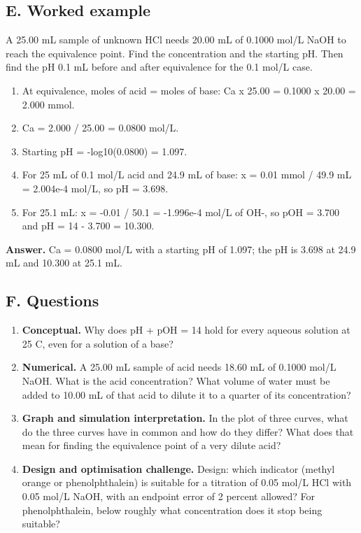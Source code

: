 \documentclass[11pt,a4paper]{article}
\begin{document}
\subsection*{E. Worked example}
A 25.00 mL sample of unknown HCl needs 20.00 mL of 0.1000 mol/L NaOH to reach the equivalence point. Find the concentration and the starting pH. Then find the pH 0.1 mL before and after equivalence for the 0.1 mol/L case.
\begin{enumerate}[nosep]
\item At equivalence, moles of acid = moles of base: Ca x 25.00 = 0.1000 x 20.00 = 2.000 mmol.
\item Ca = 2.000 / 25.00 = 0.0800 mol/L.
\item Starting pH = -log10(0.0800) = 1.097.
\item For 25 mL of 0.1 mol/L acid and 24.9 mL of base: x = 0.01 mmol / 49.9 mL = 2.004e-4 mol/L, so pH = 3.698.
\item For 25.1 mL: x = -0.01 / 50.1 = -1.996e-4 mol/L of OH-, so pOH = 3.700 and pH = 14 - 3.700 = 10.300.
\end{enumerate}
\textbf{Answer.} Ca = 0.0800 mol/L with a starting pH of 1.097; the pH is 3.698 at 24.9 mL and 10.300 at 25.1 mL.

\subsection*{F. Questions}
\begin{enumerate}[nosep]
\item \textbf{Conceptual.} Why does pH + pOH = 14 hold for every aqueous solution at 25 C, even for a solution of a base?
\item \textbf{Numerical.} A 25.00 mL sample of acid needs 18.60 mL of 0.1000 mol/L NaOH. What is the acid concentration? What volume of water must be added to 10.00 mL of that acid to dilute it to a quarter of its concentration?
\item \textbf{Graph and simulation interpretation.} In the plot of three curves, what do the three curves have in common and how do they differ? What does that mean for finding the equivalence point of a very dilute acid?
\item \textbf{Design and optimisation challenge.} Design: which indicator (methyl orange or phenolphthalein) is suitable for a titration of 0.05 mol/L HCl with 0.05 mol/L NaOH, with an endpoint error of 2 percent allowed? For phenolphthalein, below roughly what concentration does it stop being suitable?
\end{enumerate}
\end{document}
